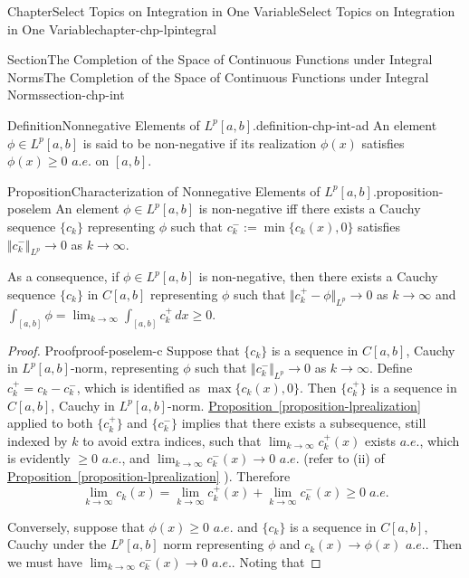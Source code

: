 \documentclass[oneside,10pt,]{book}
\newcommand{\xreffont}{\relax}
\numberwithin{equation}{section}
\begin{document}
\begin{chapterptx}{Chapter}{Select Topics on Integration in One Variable}{}{Select Topics on Integration in One Variable}{}{}{chapter-chp-lpintegral}
\begin{sectionptx}{Section}{The Completion of the Space of Continuous Functions under Integral Norms}{}{The Completion of the Space of Continuous Functions under Integral Norms}{}{}{section-chp-int}
\begin{definition}{Definition}{Nonnegative Elements of \(L^{p}[a, b]\).}{definition-chp-int-ad}%
An element \(\phi \in L^{p}[a, b]\) is said to be non-negative if its realization \(\phi (x)\) satisfies \(\phi (x) \ge 0\)  \(a.e.\) on \([a, b]\).%
\end{definition}
\begin{proposition}{Proposition}{Characterization of Nonnegative Elements of \(L^{p}[a, b]\).}{}{proposition-poselem}%
An element \(\phi \in L^{p}[a, b]\) is non-negative iff there exists a Cauchy sequence \(\{ c_{k}\}\) representing \(\phi\) such that \(c_{k}^{-}:=\min\{ c_{k}(x), 0\}\) satisfies \(\Vert c_{k}^{-} \Vert_{L^{p}}\to 0\) as \(k\to \infty\).%
\par
As a consequence, if \(\phi \in L^{p}[a, b]\) is non-negative, then there exists a Cauchy sequence \(\{ c_{k}\}\) in \(C[a, b]\) representing \(\phi\) such that \(\Vert c_{k}^{+} -\phi\Vert_{L^{p}}\to 0\) as \(k\to \infty\) and \(\int_{[a, b]} \phi = \lim_{k\to\infty} \int_{[a, b]} c_{k}^{+}\, dx \ge 0\).\footnotemark{}%
\end{proposition}
\begin{proof}{Proof}{}{proof-poselem-c}
Suppose that \(\{ c_{k}\}\) is a sequence in \(C[a, b]\), Cauchy in \(L^{p}[a, b]\)-norm, representing \(\phi\) such that \(\Vert c_{k}^{-} \Vert_{L^{p}}\to 0\) as \(k\to \infty\). Define \(c_{k}^{+}=c_{k}- c_{k}^{-}\), which is identified as \(\max\{ c_{k}(x), 0\}\). Then \(\{ c_{k}^{+}\}\) is a sequence in \(C[a, b]\), Cauchy in \(L^{p}[a, b]\)-norm. \hyperref[proposition-lprealization]{Proposition~{\xreffont\ref{proposition-lprealization}}} applied to both \(\{ c_{k}^{+}\}\) and \(\{ c_{k}^{-}\}\) implies that there exists a subsequence, still indexed by \(k\) to avoid extra indices, such that \(\lim_{k\to \infty} c_{k}^{+}(x)\) exists \(a.e.\), which is evidently \(\ge 0\) \(a.e.\), and \(\lim_{k\to \infty} c_{k}^{-}(x)\to 0\) \(a.e.\) (refer to (ii) of \hyperref[proposition-lprealization]{Proposition~{\xreffont\ref{proposition-lprealization}}} ). Therefore%
\begin{equation*}
\lim_{k\to \infty} c_{k}(x)= \lim_{k\to \infty} c_{k}^{+}(x) + \lim_{k\to \infty} c_{k}^{-}(x)\ge 0 \; a.e.
\end{equation*}
%
\par
Conversely, suppose that \(\phi (x)\ge 0\) \(a.e.\) and \(\{c_{k}\}\) is a  sequence in \(C[a, b]\), Cauchy under the \(L^{p}[a, b]\) norm representing \(\phi\) and \(c_{k}(x)\to \phi(x)\) \(a.e.\).  Then we must have \(\lim_{k\to \infty} c_{k}^{-}(x)\to 0\) \(a.e.\). Noting that%

\end{proof}
\end{sectionptx}
\end{chapterptx}
\end{document}
